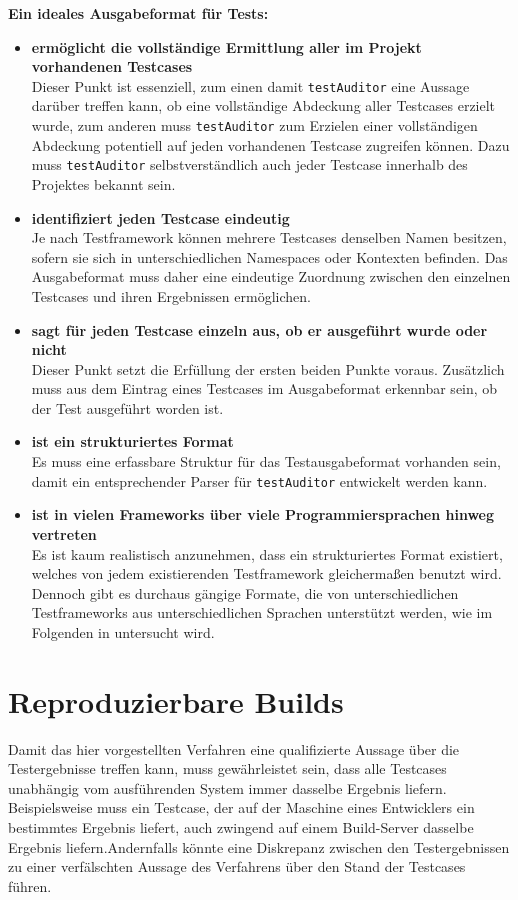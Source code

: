 \textbf{Ein ideales Ausgabeformat für Tests:}
\begin{itemize}
    \item \textbf{ermöglicht die vollständige Ermittlung aller im Projekt vorhandenen Testcases}\\
    Dieser Punkt ist essenziell, zum einen damit \texttt{testAuditor} eine Aussage darüber treffen kann, ob eine vollständige Abdeckung aller Testcases erzielt wurde, zum anderen muss \texttt{testAuditor} zum Erzielen einer vollständigen Abdeckung potentiell auf jeden vorhandenen Testcase zugreifen können. Dazu muss \texttt{testAuditor} selbstverständlich auch jeder Testcase innerhalb des Projektes bekannt sein.
    \newpage
    \item \textbf{identifiziert jeden Testcase eindeutig}\\
    Je nach Testframework können mehrere Testcases denselben Namen besitzen, sofern sie sich in unterschiedlichen Namespaces oder Kontexten befinden. Das Ausgabeformat muss daher eine eindeutige Zuordnung zwischen den einzelnen Testcases und ihren Ergebnissen ermöglichen. 
    \item \textbf{sagt für jeden Testcase einzeln aus, ob er ausgeführt wurde oder nicht}\\
    Dieser Punkt setzt die Erfüllung der ersten beiden Punkte voraus. Zusätzlich muss aus dem Eintrag eines Testcases im Ausgabeformat erkennbar sein, ob der Test ausgeführt worden ist.
    \item \textbf{ist ein strukturiertes Format}\\
    Es muss eine erfassbare Struktur für das Testausgabeformat vorhanden sein, damit ein entsprechender Parser für \texttt{testAuditor} entwickelt werden kann.
    \item \textbf{ist in vielen Frameworks über viele Programmiersprachen hinweg vertreten}\\
    Es ist kaum realistisch anzunehmen, dass ein strukturiertes Format existiert, welches von jedem existierenden Testframework gleichermaßen benutzt wird. Dennoch gibt es durchaus gängige Formate, die von unterschiedlichen Testframeworks aus unterschiedlichen Sprachen unterstützt werden, wie im Folgenden in  untersucht wird. 
\end{itemize}

\section{Reproduzierbare Builds}\label{chap:determinism}
Damit das hier vorgestellten Verfahren eine qualifizierte Aussage über die Testergebnisse treffen kann, muss gewährleistet sein, dass alle Testcases unabhängig vom ausführenden System immer dasselbe Ergebnis liefern. Beispielsweise muss ein Testcase, der auf der Maschine eines Entwicklers ein bestimmtes Ergebnis liefert, auch zwingend auf einem Build-Server dasselbe Ergebnis liefern.Andernfalls könnte eine Diskrepanz zwischen den Testergebnissen zu einer verfälschten Aussage des Verfahrens über den Stand der Testcases führen. 

